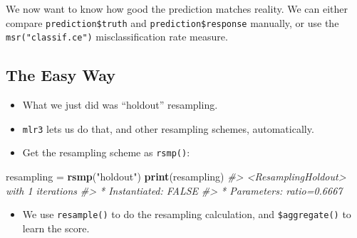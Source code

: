 \documentclass[]{article}
\newenvironment{Shaded}{\begin{snugshade}}{\end{snugshade}}
\newcommand{\CommentTok}[1]{\textcolor[rgb]{0.56,0.35,0.01}{\textit{#1}}}
\newcommand{\KeywordTok}[1]{\textcolor[rgb]{0.13,0.29,0.53}{\textbf{#1}}}
\newcommand{\NormalTok}[1]{#1}
\newcommand{\OperatorTok}[1]{\textcolor[rgb]{0.81,0.36,0.00}{\textbf{#1}}}
\newcommand{\StringTok}[1]{\textcolor[rgb]{0.31,0.60,0.02}{#1}}
\providecommand{\tightlist}{%
  \setlength{\itemsep}{0pt}\setlength{\parskip}{0pt}}
\begin{document}
We now want to know how good the prediction matches reality. We can
either compare \texttt{prediction\$truth} and
\texttt{prediction\$response} manually, or use the
\texttt{msr("classif.ce")} misclassification rate measure.

\begin{Shaded}
\end{Shaded}

\hypertarget{the-easy-way}{%
\subsection{The Easy Way}\label{the-easy-way}}

\begin{itemize}
\tightlist
\item
  What we just did was ``holdout'' resampling.
\item
  \texttt{mlr3} lets us do that, and other resampling schemes,
  automatically.
\item
  Get the resampling scheme as \texttt{rsmp()}:
\end{itemize}

\begin{Shaded}
\begin{Highlighting}[]
\NormalTok{resampling =}\StringTok{ }\KeywordTok{rsmp}\NormalTok{(}\StringTok{"holdout"}\NormalTok{)}
\KeywordTok{print}\NormalTok{(resampling)}
\CommentTok{#> <ResamplingHoldout> with 1 iterations}
\CommentTok{#> * Instantiated: FALSE}
\CommentTok{#> * Parameters: ratio=0.6667}
\end{Highlighting}
\end{Shaded}

\begin{itemize}
\tightlist
\item
  We use \texttt{resample()} to do the resampling calculation, and
  \texttt{\$aggregate()} to learn the score.
\end{itemize}
\end{document}
